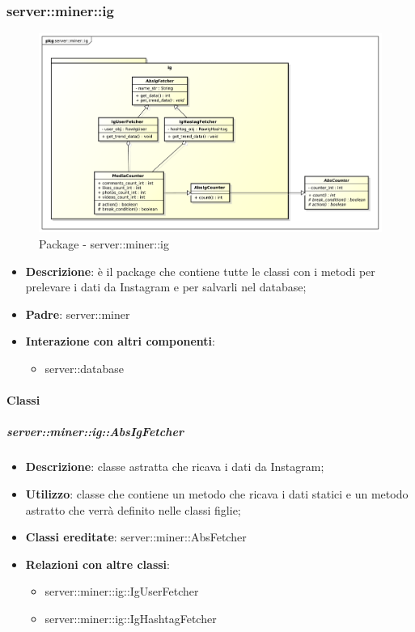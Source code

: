 \subsubsection{server::miner::ig} %
\label{ssub:bdsm_app_server_miner_ig}
\begin{figure}[htbp]
	\centering
	\centerline{\includegraphics[scale=0.4]{./images/server/miner_ig.pdf}}
	\caption{Package - server::miner::ig}
\end{figure}


\begin{itemize}
  \item \textbf{Descrizione}: è il package che contiene tutte le classi con i metodi per prelevare i dati da Instagram e per salvarli nel database;
  \item \textbf{Padre}: server::miner
   \item \textbf{Interazione con altri componenti}:
  	\begin{itemize}
  		\item server::database
  	\end{itemize}
\end{itemize}

	\paragraph{Classi} %
	\subparagraph{server::miner::ig::AbsIgFetcher} %
		\label{subp:server_miner_ig_AbsIgFetcher}
			\begin{itemize}
				\item \textbf{Descrizione}: classe astratta che ricava i dati da Instagram;
				\item \textbf{Utilizzo}: classe che contiene un metodo che ricava i dati statici e un metodo astratto che verrà definito nelle classi figlie;
				\item \textbf{Classi ereditate}: server::miner::AbsFetcher
				\item \textbf{Relazioni con altre classi}:
					\begin{itemize}
						\item server::miner::ig::IgUserFetcher
						\item server::miner::ig::IgHashtagFetcher
					\end{itemize}
			\end{itemize}

